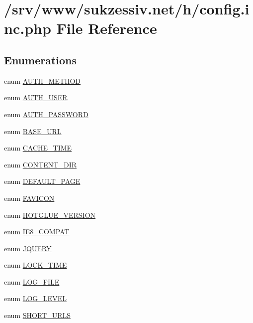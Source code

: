 \hypertarget{config_8inc_8php}{
\section{/srv/www/sukzessiv.net/h/config.inc.php File Reference}
\label{config_8inc_8php}
}
\subsection*{Enumerations}
\begin{CompactItemize}
\item 
enum \hyperlink{config_8inc_8php_2ee7e30fa45253c5e303994703d3293f}{AUTH\_\-METHOD} 
\item 
enum \hyperlink{config_8inc_8php_7d3a74ff015a9f789a5a2e554a9fa956}{AUTH\_\-USER} 
\item 
enum \hyperlink{config_8inc_8php_df2112da607b39714ba9cca31b42a93a}{AUTH\_\-PASSWORD} 
\item 
enum \hyperlink{config_8inc_8php_16548ab75ed30cbddce178d56d26dbb8}{BASE\_\-URL} 
\item 
enum \hyperlink{config_8inc_8php_fc454c0433a87811735836800fe3350b}{CACHE\_\-TIME} 
\item 
enum \hyperlink{config_8inc_8php_9949c9013641bf07cd112607d200d6ff}{CONTENT\_\-DIR} 
\item 
enum \hyperlink{config_8inc_8php_4208e17d37801abf0982b2d1e625a8f2}{DEFAULT\_\-PAGE} 
\item 
enum \hyperlink{config_8inc_8php_fd55d95ee6651060397404533516882a}{FAVICON} 
\item 
enum \hyperlink{config_8inc_8php_7c35565a4692ae46fd1c04340f4f1ca9}{HOTGLUE\_\-VERSION} 
\item 
enum \hyperlink{config_8inc_8php_1d76a949b348522c90864da5df468d51}{IE8\_\-COMPAT} 
\item 
enum \hyperlink{config_8inc_8php_5c2fff7e41a0380fb7872627e3a14a29}{JQUERY} 
\item 
enum \hyperlink{config_8inc_8php_924ae40271cc363050158e36b3823407}{LOCK\_\-TIME} 
\item 
enum \hyperlink{config_8inc_8php_6de83433b64b24349644a4c2d839dcb7}{LOG\_\-FILE} 
\item 
enum \hyperlink{config_8inc_8php_a5a9053636a30269210c54e734e0d583}{LOG\_\-LEVEL} 
\item 
enum \hyperlink{config_8inc_8php_377ac3321785e25215435e8d9802bc34}{SHORT\_\-URLS} 
\item 

\end{CompactItemize}
